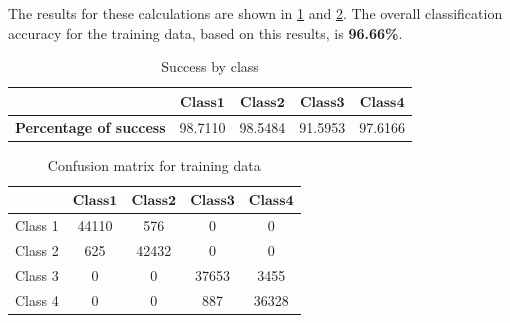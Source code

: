 \documentclass[a4paper, article, oneside, UKenglish]{memoir}
\newcommand{\0}{\mathbf{0}}
\newcommand{\1}{\mathbf{1}}
\begin{document}
The results for these calculations are shown in \cref{tab:ps1} and \cref{tab:cm1}. The overall classification accuracy for the training data, based on this results, is \textbf{96.66\%}.

\begin{table}[H]
    \centering
    \begin{tabular}{ccccc}
        \toprule
        \(\boldsymbol{}\) & \(\boldsymbol{Class 1}\) & \(\boldsymbol{Class 2}\) & \(\boldsymbol{Class 3}\) & \(\boldsymbol{Class 4}\)
        \\
        \midrule
        \textbf{Percentage of success} & 98.7110 & 98.5484 & 91.5953 & 97.6166
	\\
        \bottomrule
    \end{tabular}
    \caption{Success by class}
    \label{tab:ps1}
\end{table}

\begin{table}[H]
    \centering
    \begin{tabular}{ccccc}
        \toprule
        \(\boldsymbol{}\) & \(\boldsymbol{Class 1}\) & \(\boldsymbol{Class 2}\) & \(\boldsymbol{Class 3}\) & \(\boldsymbol{Class 4}\)
        \\
        \midrule
        Class 1 & 44110 & 576 & 0 & 0
	\\
	Class 2 & 625 & 42432 & 0 & 0
	\\
	Class 3 & 0 & 0 & 37653 & 3455
	\\
	Class 4 & 0 & 0 & 887 & 36328
        \\
        \bottomrule
    \end{tabular}
    \caption{Confusion matrix for training data}
    \label{tab:cm1}
\end{table}
\end{document}
